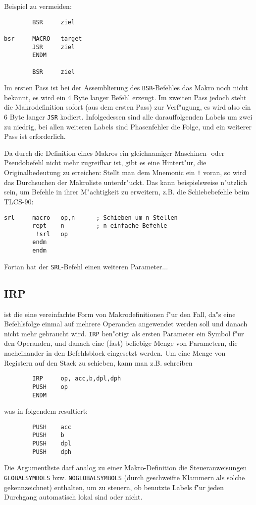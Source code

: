 \documentclass[12pt,a4paper,twoside]{report}
\makeatletter
\newcommand{\tty}[1]{{\tt #1}}
\newcommand{\ttindex}[1]{\index{#1@{\tt #1}}}
\makeatother
\begin{document}
Beispiel zu vermeiden:
\begin{verbatim}
        BSR     ziel

bsr     MACRO   target
        JSR     ziel
        ENDM

        BSR     ziel
\end{verbatim}
Im ersten Pass ist bei der Assemblierung des \tty{BSR}-Befehles das Makro
noch nicht bekannt, es wird ein 4 Byte langer Befehl erzeugt.  Im
zweiten Pass jedoch steht die Makrodefinition sofort (aus dem ersten
Pass) zur Verf"ugung, es wird also ein 6 Byte langer \tty{JSR} kodiert.
Infolgedessen sind alle darauffolgenden Labels um zwei zu niedrig,
bei allen weiteren Labels sind Phasenfehler die Folge, und ein weiterer
Pass ist erforderlich.
\par
Da durch die Definition eines Makros ein gleichnamiger Maschinen- oder
Pseudobefehl nicht mehr zugreifbar ist, gibt es eine Hintert"ur, die
Originalbedeutung zu erreichen: Stellt man dem Mnemonic ein \tty{!} voran,
so wird das Durchsuchen der Makroliste unterdr"uckt.  Das kann
beispielsweise n"utzlich sein, um Befehle in ihrer M"achtigkeit zu
erweitern, z.B. die Schiebebefehle beim TLCS-90:
\begin{verbatim}
srl     macro   op,n      ; Schieben um n Stellen
        rept    n         ; n einfache Befehle
         !srl   op
        endm
        endm
\end{verbatim}
Fortan hat der \tty{SRL}-Befehl einen weiteren Parameter...


\subsection{IRP}
\ttindex{IRP}

ist die eine vereinfachte Form von Makrodefinitionen f"ur den Fall,
da"s eine Befehlsfolge einmal auf mehrere Operanden angewendet werden
soll und danach nicht mehr gebraucht wird.  \tty{IRP} ben"otigt als ersten
Parameter ein Symbol f"ur den Operanden, und danach eine (fast)
beliebige Menge von Parametern, die nacheinander in den Befehlsblock
eingesetzt werden.  Um eine Menge von Registern auf den Stack zu
schieben, kann man z.B. schreiben
\begin{verbatim}
        IRP     op, acc,b,dpl,dph
        PUSH    op
        ENDM
\end{verbatim}
was in folgendem resultiert:
\begin{verbatim}
        PUSH    acc
        PUSH    b
        PUSH    dpl
        PUSH    dph
\end{verbatim}
Die Argumentliste darf analog zu einer Makro-Definition die
Steueranweisungen \tty{GLOBALSYMBOLS} bzw. \tty{NOGLOBALSYMBOLS} (durch
geschweifte Klammern als solche gekennzeichnet) enthalten, um zu
steuern, ob benutzte Labels f"ur jeden Durchgang automatisch lokal
sind oder nicht.
\end{document}
